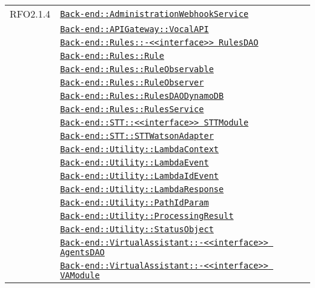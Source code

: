 \begin{longtable}{|>{\centering}m{3cm}|m{10cm}<{\centering}|}
RFO2.1.4 & \hyperref[Back-end::AdministrationWebhookService]{\texttt{Back-end::AdministrationWebhookService}}\\
& \hyperref[Back-end::APIGateway::VocalAPI]{\texttt{Back-end::APIGateway::VocalAPI}}\\
& \hyperref[Back-end::Rules::<<interface>> RulesDAO]{\texttt{Back-end::Rules::-\linebreak <<interface>> RulesDAO}}\\
& \hyperref[Back-end::Rules::Rule]{\texttt{Back-end::Rules::Rule}}\\
& \hyperref[Back-end::Rules::RuleObservable]{\texttt{Back-end::Rules::RuleObservable}}\\
& \hyperref[Back-end::Rules::RuleObserver]{\texttt{Back-end::Rules::RuleObserver}}\\
& \hyperref[Back-end::Rules::RulesDAODynamoDB]{\texttt{Back-end::Rules::RulesDAODynamoDB}}\\
& \hyperref[Back-end::Rules::RulesService]{\texttt{Back-end::Rules::RulesService}}\\
& \hyperref[Back-end::STT::<<interface>> STTModule]{\texttt{Back-end::STT::<<interface>> STTModule}}\\
& \hyperref[Back-end::STT::STTWatsonAdapter]{\texttt{Back-end::STT::STTWatsonAdapter}}\\
& \hyperref[Back-end::Utility::LambdaContext]{\texttt{Back-end::Utility::LambdaContext}}\\
& \hyperref[Back-end::Utility::LambdaEvent]{\texttt{Back-end::Utility::LambdaEvent}}\\
& \hyperref[Back-end::Utility::LambdaIdEvent]{\texttt{Back-end::Utility::LambdaIdEvent}}\\
& \hyperref[Back-end::Utility::LambdaResponse]{\texttt{Back-end::Utility::LambdaResponse}}\\
& \hyperref[Back-end::Utility::PathIdParam]{\texttt{Back-end::Utility::PathIdParam}}\\
& \hyperref[Back-end::Utility::ProcessingResult]{\texttt{Back-end::Utility::ProcessingResult}}\\
& \hyperref[Back-end::Utility::StatusObject]{\texttt{Back-end::Utility::StatusObject}}\\
& \hyperref[Back-end::VirtualAssistant::<<interface>> AgentsDAO]{\texttt{Back-end::VirtualAssistant::-\linebreak <<interface>> AgentsDAO}}\\
& \hyperref[Back-end::VirtualAssistant::<<interface>> VAModule]{\texttt{Back-end::VirtualAssistant::-\linebreak <<interface>> VAModule}}\\

\end{longtable}
